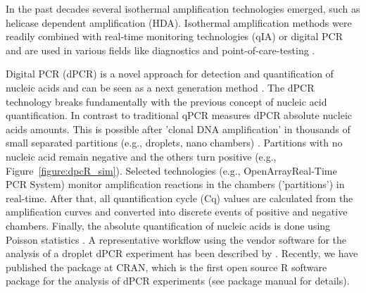 In the past decades several isothermal amplification technologies emerged, such 
as helicase dependent amplification (HDA). Isothermal 
amplification methods were readily combined with real-time monitoring technologies (qIA) 
or digital PCR and are used in various fields like diagnostics and 
point-of-care-testing \citep{selck_2013, rodiger_nucleic_2014, nixon_2014}.

Digital PCR (dPCR) is a novel approach for detection and quantification of 
nucleic acids and can be seen as a next generation method 
\citep{huggett_qpcr_2015}. The dPCR technology breaks fundamentally with the 
previous concept of nucleic acid quantification. In contrast to traditional qPCR 
measures dPCR absolute nucleic acids amounts. This is possible after 'clonal DNA 
amplification' in thousands of small separated partitions (e.g., droplets, nano 
chambers) \citep{huggett_2013, milbury_2014, morley_2014}. Partitions with no 
nucleic acid remain negative and the others turn positive (e.g., 
Figure~\ref{figure:dpcR_sim}). Selected technologies (e.g., 
OpenArray\textregistered Real-Time PCR System) monitor amplification reactions 
in the chambers ('partitions') in real-time. After that, all quantification 
cycle (Cq) values are calculated from the amplification curves and converted 
into discrete events of positive and negative chambers. Finally, the 
absolute quantification of nucleic acids is done using Poisson statistics 
\citep{milbury_2014, morley_2014}. A representative workflow using the vendor 
software for the analysis of a droplet dPCR experiment has been described by 
\citet{milbury_2014}. Recently, we have published the  package at 
CRAN, which is the first open source R software package for the analysis of dPCR 
experiments (see  package manual for details).

